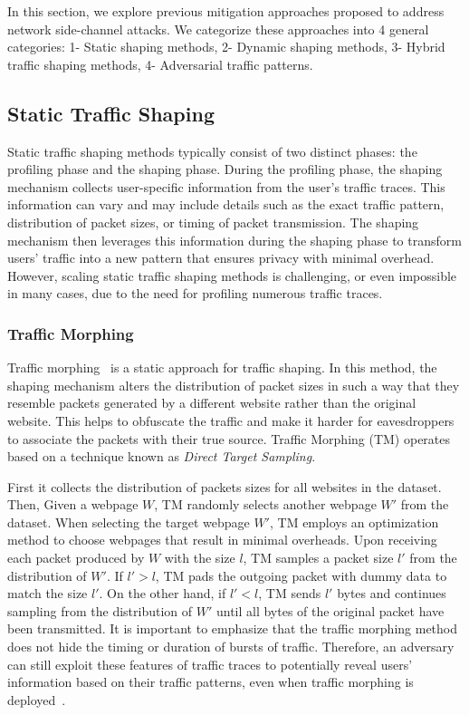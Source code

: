 In this section, we explore previous mitigation approaches proposed to address network side-channel attacks. 
We categorize these approaches into 4 general categories: 1- Static shaping methods, 2- Dynamic shaping methods, 3- Hybrid traffic shaping methods, 4- Adversarial traffic patterns. 




\subsection{Static Traffic Shaping}\label{subsec:static-traffic-shaping}
Static traffic shaping methods typically consist of two distinct phases: the profiling phase and the shaping phase.
During the profiling phase, the shaping mechanism collects user-specific information from the user's traffic traces.
This information can vary and may include details such as the exact traffic pattern, distribution of packet sizes, or timing of packet transmission.
The shaping mechanism then leverages this information during the shaping phase to transform users' traffic into a new pattern that ensures privacy with minimal overhead.
However, scaling static traffic shaping methods is challenging, or even impossible in many cases, due to the need for profiling numerous traffic traces.
\subsubsection{Traffic Morphing}\label{subsubsec:traffic-morphing}
Traffic morphing~\cite{wright2009traffic} is a static approach for traffic shaping. 
In this method, the shaping mechanism alters the distribution of packet sizes in such a way that they resemble packets generated by a different website rather than the original website.
This helps to obfuscate the traffic and make it harder for eavesdroppers to associate the packets with their true source.
Traffic Morphing (TM) operates based on a technique known as \textit{Direct Target Sampling}.

First it collects the distribution of packets sizes for all websites in the dataset.
Then, Given a webpage $W$, TM randomly selects another webpage $W'$ from the dataset.
When selecting the target webpage $W'$, TM employs an optimization method to choose webpages that result in minimal overheads. 
Upon receiving each packet produced by $W$ with the size $l$, TM samples a packet size $l'$ from the distribution of $W'$. 
If $l' > l$, TM pads the outgoing packet with dummy data to match the size $l'$. 
On the other hand, if $l' < l$, TM sends $l'$ bytes and continues sampling from the distribution of $W'$ until all bytes of the original packet have been transmitted.
It is important to emphasize that the traffic morphing method does not hide the timing or duration of bursts of traffic.
Therefore, an adversary can still exploit these features of traffic traces to potentially reveal users' information based on their traffic patterns, even when traffic morphing is deployed~\cite{dyer2012peek}.


